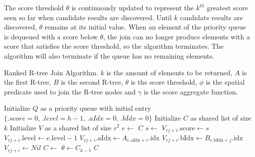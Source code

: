 The score threshold \(\theta\) is continuously updated to represent the \(k^{th}\) greatest score seen so far when candidate results are discovered. Until \(k\) candidate results are discovered, \(\theta\) remains at its initial value. When an element of the priority queue is dequeued with a score below \(\theta\), the join can no longer produce elements with a score that satisfies the score threshold, so the algorithm terminates. The algorithm will also terminate if the queue has no remaining elements.

\begin{algorithm}
  \caption{Ranked R-tree Join Algorithm. \(k\) is the amount of elements to be returned, \(A\) is the first R-tree, \(B\) is the second R-tree, \(\theta\) is the score threshold, \(\phi\) is the spatial predicate used to join the R-tree nodes and \(\gamma\) is the score aggregate function.}
  \label{alg/ranked-r-tree-join}
  \begin{algorithmic}[1]
      \State Initialize \(Q\) as a priority queue with initial entry \(\{ .score=0,\, .level=h - 1,\, .aIdx=0,\, .bIdx=0 \}\)
      \State Initialize \(C\) as shared list of size \(k\)
      \State Initialize \(V\) as a shared list of size \(r^2\)
        \State \(e \gets\) 
          \State \Return \(C\) 
        \EndIf
          \State \(s \gets\) 
            \State \(V_{rj + i}.\mathrm{score} \gets s\)
            \State \(V_{rj + i}.\mathrm{level} \gets e.\mathrm{level} - 1\)
            \State \(V_{rj + i}.\mathrm{aIdx} \gets A_{e.\mathrm{aIdx} + i}.\mathrm{idx}\)
            \State \(V_{rj + i}.\mathrm{bIdx} \gets B_{e.\mathrm{bIdx} + j}.\mathrm{idx}\)
          \Else
            \State \(V_{rj + i} \gets Nil\)
          \EndIf
        \EndFor
        \State {}
         
          \State {}
        \Else {}
          \State \(C \gets\) 
            \State \(\theta \gets C_{k - 1}\)
          \EndIf
        \EndIf
      \EndWhile
      \State \Return \(C\) 
    \EndFunction
  \end{algorithmic}
\end{algorithm}

